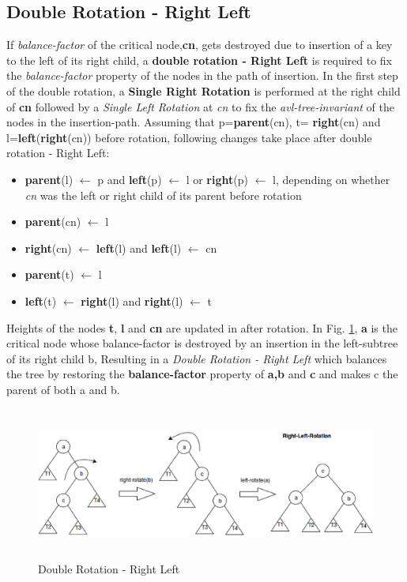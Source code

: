 \documentclass[MTech]{iitmdiss}
\begin{document}
\subsection*{Double Rotation - Right Left}
If \textit{balance-factor} of the critical node,\textbf{cn}, gets destroyed due to insertion of a key to the left of its right child, a \textbf{double rotation - Right Left } is required to fix the \textit{balance-factor} property of the nodes in the path of insertion. In the first step of the double rotation, a \textbf{Single Right Rotation} is performed at the right child of \textbf{cn} followed by a \textit{Single Left Rotation} at \textit{cn} to fix the \textit{avl-tree-invariant} of the nodes in the insertion-path. Assuming that p=\textbf{parent}(cn), t= \textbf{right}(cn) and l=\textbf{left}(\textbf{right}(cn)) before rotation, following changes take place after double rotation - Right Left:
\begin{itemize}
\item \textbf{parent}(l) $\leftarrow$ p  and \textbf{left}(p) $\leftarrow$ l or \textbf{right}(p) $\leftarrow$ l, depending on whether \textit{cn} was the left or right child of its parent before rotation
\item \textbf{parent}(cn) $\leftarrow$ l
\item \textbf{right}(cn) $\leftarrow$ \textbf{left}(l) and \textbf{left}(l) $\leftarrow$ cn
\item \textbf{parent}(t) $\leftarrow$ l
\item \textbf{left}(t) $\leftarrow$ \textbf{right}(l) and \textbf{right}(l) $\leftarrow$ t 
\end{itemize}
Heights of the nodes \textbf{t}, \textbf{l} and \textbf{cn} are updated in after rotation. In Fig. \ref{fig:right_left}, \textbf{a} is the critical node whose balance-factor is destroyed by an insertion in the left-subtree of its right child b, Resulting in a \textit{Double Rotation - Right Left} which balances the tree by restoring the \textbf{balance-factor} property of \textbf{a,b} and \textbf{c} and makes c the parent of both a and b.

\begin{figure}
\centering
\includegraphics[width=15cm,height=5cm]{Right-Left}
\caption{Double Rotation - Right Left}
\label{fig:right_left}
\end{figure}
\end{document}
